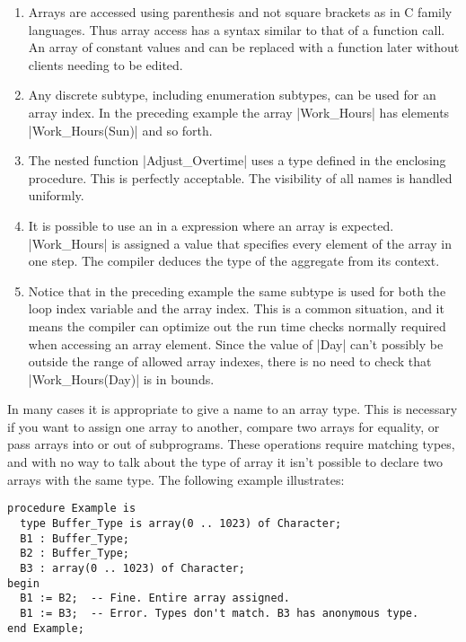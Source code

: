 \begin{enumerate}

\item Arrays are accessed using parenthesis and not square brackets as in C family languages.
  Thus array access has a syntax similar to that of a function call. An array of constant values
  and can be replaced with a function later without clients needing to be edited.

\item Any discrete subtype, including enumeration subtypes, can be used for an array index. In
  the preceding example the array |Work_Hours| has elements |Work_Hours(Sun)| and so forth.

\item The nested function |Adjust_Overtime| uses a type defined in the enclosing procedure. This
  is perfectly acceptable. The visibility of all names is handled uniformly.

\item It is possible to use an  in a expression where an array is
  expected. |Work_Hours| is assigned a value that specifies every element of the array in one
  step. The compiler deduces the type of the aggregate from its context.

\item Notice that in the preceding example the same subtype is used for both the loop index
  variable and the array index. This is a common situation, and it means the compiler can
  optimize out the run time checks normally required when accessing an array element. Since the
  value of |Day| can't possibly be outside the range of allowed array indexes, there is no need
  to check that |Work_Hours(Day)| is in bounds.

\end{enumerate}

In many cases it is appropriate to give a name to an array type. This is necessary if you want
to assign one array to another, compare two arrays for equality, or pass arrays into or out of
subprograms. These operations require matching types, and with no way to talk about the type of
array it isn't possible to declare two arrays with the same type. The following example
illustrates:

\begin{lstlisting}
procedure Example is
  type Buffer_Type is array(0 .. 1023) of Character;
  B1 : Buffer_Type;
  B2 : Buffer_Type;
  B3 : array(0 .. 1023) of Character;
begin
  B1 := B2;  -- Fine. Entire array assigned.
  B1 := B3;  -- Error. Types don't match. B3 has anonymous type.
end Example;
\end{lstlisting}

